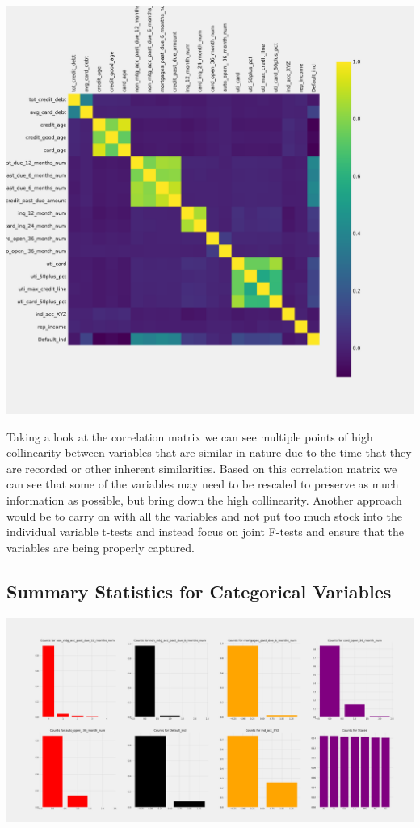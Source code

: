 \documentclass[12pt]{article}
\begin{document}
	\begin{center}
		\includegraphics[scale = 0.3]{../notebooks/CorMat.png}
	\end{center}
	
	Taking a look at the correlation matrix we can see multiple points of high collinearity between variables that are similar in nature due to the time that they are recorded or other inherent similarities. Based on this correlation matrix we can see that some of the variables may need to be rescaled to preserve as much information as possible, but bring down the high collinearity. Another approach would be to carry on with all the variables and not put too much stock into the individual variable t-tests and instead focus on joint F-tests and ensure that the variables are being properly captured. 
	
	\subsection{Summary Statistics for Categorical Variables}
	
	\begin{center}
		\includegraphics[scale=0.15]{../notebooks/counts.png}
	\end{center}
	
\end{document}
